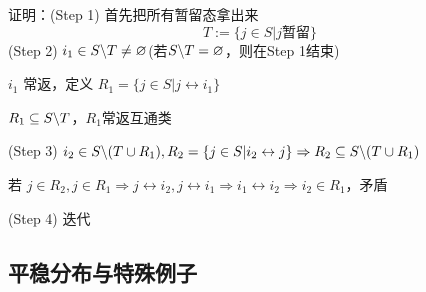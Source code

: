 证明：(Step 1) 首先把所有暂留态拿出来
\[
T:=\{j\in S|j\text{暂留}\}
\]
(Step 2) $i_1\in S\backslash T\neq \varnothing$(若$S\backslash T=\varnothing$，则在Step 1结束)

$i_1$ 常返，定义 $R_1=\{j\in S|j\leftrightarrow i_1\}$

$R_1\subseteq S\backslash T$，$R_1$常返互通类

(Step 3) $i_2\in S\backslash (T\cup R_1),R_2=\{j\in S|i_2\leftrightarrow j\}\Rightarrow R_2\subseteq S\backslash (T\cup R_1)$

若 $j\in R_2,j\in R_1\Rightarrow j\leftrightarrow i_2,j\leftrightarrow i_1\Rightarrow i_1\leftrightarrow i_2\Rightarrow i_2\in R_1$，矛盾

(Step 4) 迭代

\subsection{平稳分布与特殊例子}
